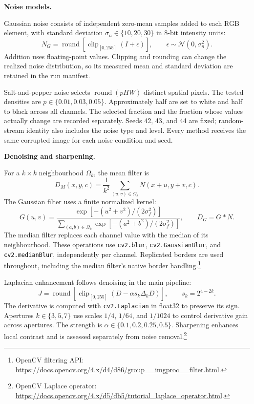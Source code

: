 \documentclass[a4paper,12pt]{article}
\begin{document}
\textbf{Noise models.}\par
Gaussian noise consists of independent zero-mean samples added to each RGB element, with standard deviation $\sigma_n\in\{10,20,30\}$ in 8-bit intensity units:
\begin{equation}
N_G=\operatorname{round}\!\left[\operatorname{clip}_{[0,255]}(I+\epsilon)\right],
\qquad \epsilon\sim\mathcal{N}(0,\sigma_n^2).
\end{equation}
Addition uses floating-point values. Clipping and rounding can change the realized noise distribution, so its measured mean and standard deviation are retained in the run manifest.

Salt-and-pepper noise selects $\operatorname{round}(pHW)$ distinct spatial pixels. The tested densities are $p\in\{0.01,0.03,0.05\}$. Approximately half are set to white and half to black across all channels. The selected fraction and the fraction whose values actually change are recorded separately. Seeds 42, 43, and 44 are fixed; random-stream identity also includes the noise type and level. Every method receives the same corrupted image for each noise condition and seed.

\textbf{Denoising and sharpening.}\par
For a $k\times k$ neighbourhood $\Omega_k$, the mean filter is
\begin{equation}
D_M(x,y,c)=\frac{1}{k^2}\sum_{(u,v)\in\Omega_k}N(x+u,y+v,c).
\end{equation}
The Gaussian filter uses a finite normalized kernel:
\begin{equation}
G(u,v)=\frac{\exp[-(u^2+v^2)/(2\sigma_f^2)]}
{\sum_{(a,b)\in\Omega_k}\exp[-(a^2+b^2)/(2\sigma_f^2)]},
\qquad D_G=G*N.
\end{equation}
The median filter replaces each channel value with the median of its neighbourhood. These operations use \texttt{cv2.blur}, \texttt{cv2.GaussianBlur}, and \texttt{cv2.medianBlur}, independently per channel. Replicated borders are used throughout, including the median filter's native border handling.\footnote{OpenCV filtering API: \url{https://docs.opencv.org/4.x/d4/d86/group__imgproc__filter.html}.}

Laplacian enhancement follows denoising in the main pipeline:
\begin{equation}
J=\operatorname{round}\!\left[\operatorname{clip}_{[0,255]}
\left(D-\alpha s_k\Delta_kD\right)\right],
\qquad s_k=2^{4-2k}.
\label{eq:a-sharpening}
\end{equation}
The derivative is computed with \texttt{cv2.Laplacian} in float32 to preserve its sign. Apertures $k\in\{3,5,7\}$ use scales $1/4$, $1/64$, and $1/1024$ to control derivative gain across apertures. The strength is $\alpha\in\{0.1,0.2,0.25,0.5\}$. Sharpening enhances local contrast and is assessed separately from noise removal.\footnote{\raggedright OpenCV Laplace operator: \url{https://docs.opencv.org/4.x/d5/db5/tutorial_laplace_operator.html}.}
\end{document}
